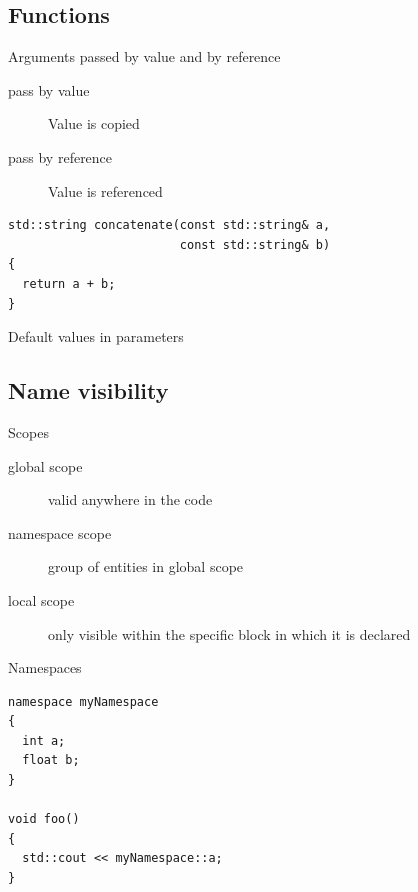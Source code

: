 \documentclass{beamer}
\begin{document}
\subsection{Functions}
\begin{frame}

\end{frame}

\begin{frame}[fragile]{Arguments passed by value and by reference}
\begin{description}
\item[pass by value] Value is copied
\item[pass by reference] Value is referenced
\end{description}
\begin{lstlisting}[caption=Const reference parameter]
std::string concatenate(const std::string& a,
                        const std::string& b)
{
  return a + b;
}
\end{lstlisting}
\end{frame}

\begin{frame}[fragile]{Default values in parameters}

\end{frame}


\subsection{Name visibility}
\begin{frame}{Scopes}
\begin{description}
\item[global scope] valid anywhere in the code
\item[namespace scope] group of entities in global scope
\item[local scope] only visible within the specific block in which it is
declared
\end{description}
\end{frame}

\begin{frame}[fragile]{Namespaces}
\begin{lstlisting}[caption=Namespace]
namespace myNamespace
{
  int a;
  float b;
}

void foo()
{
  std::cout << myNamespace::a;
}
\end{lstlisting}
\end{frame}
\end{document}
